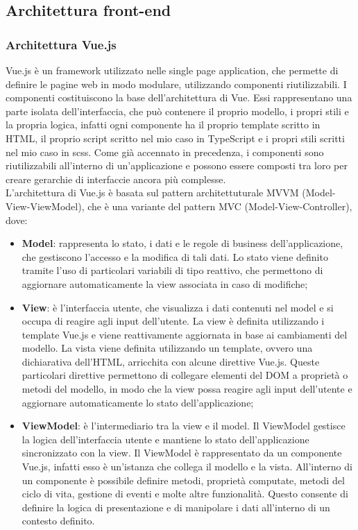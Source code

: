 \subsection{Architettura front-end}\label{subsec:architettura-front-end}
\subsubsection{Architettura Vue.js}\label{subsubsec:architettura-vue.js}
Vue.js è un framework utilizzato nelle single page application, che permette di definire le pagine web in modo modulare, utilizzando componenti riutilizzabili.
I componenti costituiscono la base dell'architettura di Vue. Essi rappresentano una parte isolata dell'interfaccia, che può contenere il proprio modello, i propri stili e la propria logica, infatti ogni componente ha il proprio
template scritto in HTML, il proprio script scritto nel mio caso in TypeScript e i propri stili scritti nel mio caso in scss.
Come già accennato in precedenza, i componenti sono riutilizzabili all'interno di un'applicazione e possono essere composti tra loro per creare gerarchie di interfaccie ancora più complesse.\\

L'architettura di Vue.js è basata sul pattern architettuturale MVVM (Model-View-ViewModel), che è una variante del pattern MVC (Model-View-Controller), dove:
\begin{itemize}
  \item \textbf{Model}: rappresenta lo stato, i dati e le regole di business dell'applicazione, che gestiscono l'accesso e la modifica di tali dati. Lo stato viene definito tramite l'uso
  di particolari variabili di tipo reattivo, che permettono di aggiornare automaticamente la view associata in caso di modifiche;
  \item \textbf{View}: è l'interfaccia utente, che visualizza i dati contenuti nel model e si occupa di reagire agli input dell'utente. La view è definita utilizzando i template Vue.js e viene reattivamente aggiornata in base ai cambiamenti del modello. La vista viene definita utilizzando un template, ovvero una dichiarativa dell'HTML, arricchita con alcune direttive Vue.js. 
  Queste particolari direttive permettono di collegare elementi del DOM a proprietà o metodi del modello, in modo che la view possa reagire agli input dell'utente e aggiornare automaticamente lo stato dell'applicazione;
  \item \textbf{ViewModel}: è l'intermediario tra la view e  il model. Il ViewModel gestisce la logica dell'interfaccia utente e mantiene lo stato dell'applicazione sincronizzato con la view.
  Il ViewModel è rappresentato da un componente Vue.js, infatti esso è un'istanza che collega il modello e la vista. All'interno di un componente è possibile definire metodi, proprietà 
  computate, metodi del ciclo di vita, gestione di eventi e molte altre funzionalità. Questo consente di definire la logica di presentazione e di manipolare i dati all'interno di un contesto definito.
\end{itemize}

